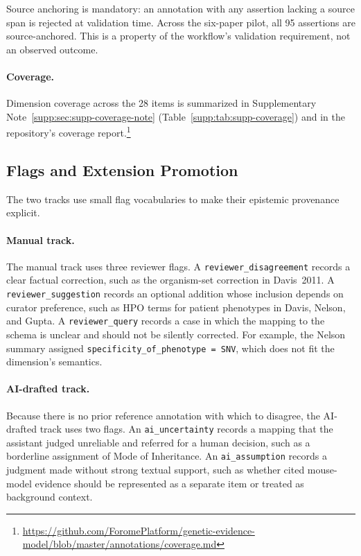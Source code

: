 Source anchoring is mandatory: an annotation with any assertion lacking a
source span is rejected at validation time. Across the six-paper pilot, all
95 assertions are source-anchored. This is a property of the workflow's
validation requirement, not an observed outcome.

\paragraph{Coverage.}
Dimension coverage across the 28 \GeneticEvidence{} items is summarized in
Supplementary Note~\ref*{supp:sec:supp-coverage-note}
(Table~\ref*{supp:tab:supp-coverage}) and in the repository's coverage
report.\footnote{\url{https://github.com/ForomePlatform/genetic-evidence-model/blob/master/annotations/coverage.md}}

\subsection{Flags and Extension Promotion}
\label{sec:workflow-flags}
\label{sec:workflow-promotion}

The two tracks use small flag vocabularies to make their epistemic
provenance explicit.

\paragraph{Manual track.}
The manual track uses three reviewer flags. A
\texttt{reviewer\_disagreement} records a clear factual correction, such
as the organism-set correction in Davis~2011. A
\texttt{reviewer\_suggestion} records an optional addition whose inclusion
depends on curator preference, such as HPO terms for patient phenotypes in
Davis, Nelson, and Gupta. A \texttt{reviewer\_query} records a case in
which the mapping to the schema is unclear and should not be silently
corrected. For example, the Nelson summary assigned
\texttt{specificity\_of\_phenotype = SNV}, which does not fit the
dimension's semantics.

\paragraph{AI-drafted track.}
Because there is no prior reference annotation with which to disagree, the
AI-drafted track uses two flags. An \texttt{ai\_uncertainty} records a
mapping that the assistant judged unreliable and referred for a human
decision, such as a borderline assignment of Mode of Inheritance. An
\texttt{ai\_assumption} records a judgment made without strong textual
support, such as whether cited mouse-model evidence should be represented
as a separate \GeneticEvidence{} item or treated as background context.


